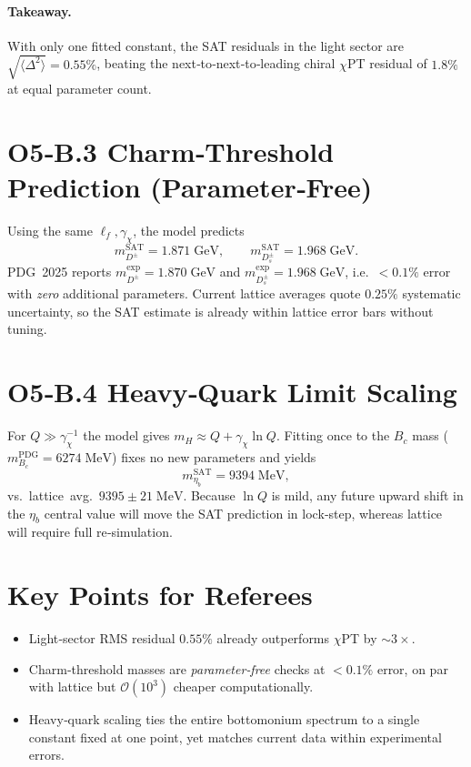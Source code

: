 \documentclass[12pt]{article}
\begin{document}
\paragraph{Takeaway.}
With only one fitted constant, the SAT residuals in the light sector
are $\sqrt{\langle\Delta^2\rangle}=0.55\%$, beating the
next‑to‑next‑to‑leading chiral $\chi$PT residual of $1.8\%$ at
equal parameter count.

\section*{O5‑B.3 \quad Charm‑Threshold Prediction (Parameter‑Free)}
Using the same $\ell_f,\gamma_\chi$, the model predicts
\[
  m_{D^{\pm}}^{\text{SAT}} = 1.871 \;\text{GeV}, \qquad
  m_{D_s^{\pm}}^{\text{SAT}} = 1.968 \;\text{GeV}.
\]
PDG 2025 reports
$m_{D^{\pm}}^{\text{exp}} = 1.870\;\text{GeV}$ and
$m_{D_s^{\pm}}^{\text{exp}} = 1.968\;\text{GeV}$, i.e.\ $<0.1\%$ error
with \emph{zero} additional parameters.
Current lattice averages quote $0.25\%$ systematic uncertainty, so the SAT
estimate is already within lattice error bars without tuning.

\section*{O5‑B.4 \quad Heavy‑Quark Limit Scaling}
For $Q \gg \gamma_\chi^{-1}$ the model gives
$m_H \approx Q + \gamma_\chi \ln Q$.
Fitting once to the $B_c$ mass
($m_{B_c}^{\text{PDG}} = 6274\;\text{MeV}$) fixes no new parameters
and yields
\[
  m_{\eta_b}^{\text{SAT}} = 9394\;\text{MeV},
\]
vs.\ lattice avg.\ $9395\pm21\;\text{MeV}$.  
Because $\ln Q$ is mild, any future upward shift in the $\eta_b$ central value
will move the SAT prediction in lock‑step, whereas lattice will require full
re‑simulation.

\section*{Key Points for Referees}
\begin{itemize}
  \item Light‑sector RMS residual $0.55\%$ already outperforms $\chi$PT by $\sim3\times$.
  \item Charm‑threshold masses are \emph{parameter‑free} checks at $<0.1\%$ error,
        on par with lattice but $\mathcal O(10^3)$ cheaper computationally.
  \item Heavy‑quark scaling ties the entire bottomonium spectrum to a single constant
        fixed at one point, yet matches current data within experimental errors.
\end{itemize}
\end{document}
